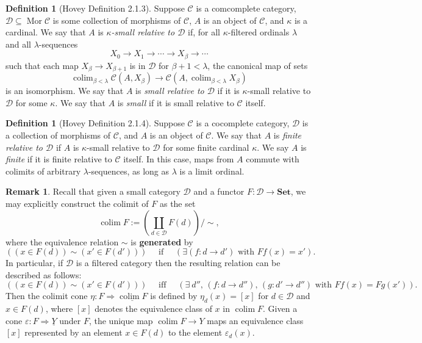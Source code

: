 \documentclass{amsart}
\theoremstyle{plain}
\theoremstyle{definition}
\newtheorem{remark}[theorem]{Remark}
\newtheorem{definition}[theorem]{Definition}
\newcommand{\Set}{\mbf{Set}}
\newcommand{\sseq}{\subseteq}
\newcommand{\0}{\mathbf{0}}
\newcommand{\cC}{\mathcal C}
\newcommand{\cD}{\mathcal D}
\newcommand{\mbf}[1]{\mathbf{#1}}
\newcommand{\ul}{\underline}
\newcommand{\vare}{\varepsilon}
\renewcommand{\(}{\left(}
\renewcommand{\)}{\right)}
\DeclareMathOperator*{\colim}{colim}
\DeclareMathOperator{\Mor}{Mor}
\begin{document}
\begin{definition}[Hovey Definition 2.1.3]\label{2.1.3}
  Suppose $\cC$ is a comcomplete category, $\cD\sseq\Mor\cC$ is some collection of morphisms of $\cC$, $A$ is an object of $\cC$, and $\kappa$ is a cardinal. We say that $A$ is \textit{$\kappa$-small relative to $\cD$} if, for all $\kappa$-filtered ordinals $\lambda$ and all $\lambda$-sequences
  \[X_0\to X_1\to\cdots\to X_\beta\to\cdots\]
  such that each map $X_\beta\to X_{\beta+1}$ is in $\cD$ for $\beta+1<\lambda$, the canonical map of sets
  \[\colim_{\beta<\lambda}\cC(A,X_\beta)\to\cC(A,\colim_{\beta<\lambda}X_\beta)\]
  is an isomorphism. We say that $A$ is \textit{small relative to $\cD$} if it is $\kappa$-small relative to $\cD$ for some $\kappa$. We say that $A$ is \textit{small} if it is small relative to $\cC$ itself.
\end{definition}

\begin{definition}[Hovey Definition 2.1.4]
  Suppose $\cC$ is a cocomplete category, $\cD$ is a collection of morphisms of $\cC$, and $A$ is an object of $\cC$. We say that $A$ is \textit{finite relative to $\cD$} if $A$ is $\kappa$-small relative to $\cD$ for some finite cardinal $\kappa$. We say $A$ is \textit{finite} if it is finite relative to $\cC$ itself. In this case, maps from $A$ commute with colimits of arbitrary $\lambda$-sequences, as long as $\lambda$ is a limit ordinal.
\end{definition}

\begin{remark}\label{explicit_description_of_colimit_in_set}
Recall that given a small category $\cD$ and a functor $F:\cD\to\Set$, we may explicitly construct the colimit of $F$ as the set
\[\colim F:=\(\coprod_{d\in \cD}F(d)\)/\sim,\]
where the equivalence relation $\sim$ is \textbf{generated} by
\[((x\in F(d))\sim(x'\in F(d')))\quad\text{ if }\quad(\exists(f:d\to d')\text{ with }Ff(x)=x').\]
In particular, if $\cD$ is a filtered category then the resulting relation can be described as follows:
\begin{equation*}
  ((x\in F(d))\sim(x'\in F(d')))\quad\text{ iff }\quad(\exists\ d'',\,(f:d\to d''),\,(g:d'\to d'')\text{ with }Ff(x)=Fg(x')).
\end{equation*}
Then the colimit cone $\eta:F\Rightarrow\ul{\colim F}$ is defined by $\eta_d(x)=[x]$ for $d\in\cD$ and $x\in F(d)$, where $[x]$ denotes the equivalence class of $x$ in $\colim F$. Given a cone $\vare:F\Rightarrow\underline Y$ under $F$, the unique map $\colim F\to Y$ maps an equivalence class $[x]$ represented by an element $x\in F(d)$ to the element $\vare_d(x)$.
\end{remark}
\end{document}
